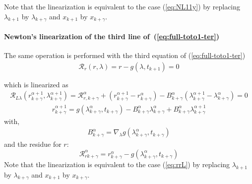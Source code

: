 Note that the linearization is equivalent to the case (\ref{eq:NL11y}) by replacing $\lambda_{k+1}$ by $\lambda_{k+\gamma}$ and $x_{k+1}$ by $x_{k+\gamma}$.

 \paragraph{Newton's linearization of the third  line of~(\ref{eq:full-toto1-ter})}
The same operation is performed with the third equation of (\ref{eq:full-toto1-ter})
\begin{equation}
  \begin{array}{l}
    \mathcal R_r(r,\lambda)=r-g(\lambda,t_{k+1}) =0\\ \\  \end{array}
\end{equation}
which is linearized as
\begin{equation}
  \label{eq:full-NL9}
  \begin{array}{l}
      \mathcal R_{L\lambda}(r^{\alpha+1}_{k+\gamma},\lambda^{\alpha+1}_{k+\gamma}) = \mathcal
      R_{r,k+\gamma}^{\alpha} + (r^{\alpha+1}_{k+\gamma} - r^{\alpha}_{k+\gamma}) - B^{\alpha}_{k+\gamma}(\lambda^{\alpha+1}_{k+\gamma} -
      \lambda^{\alpha}_{k+\gamma})=0
    \end{array}
  \end{equation}
\begin{equation}
  \label{eq:full-rrL}
  \begin{array}{l}
    \boxed{r^{\alpha+1}_{k+\gamma} = g(\lambda ^{\alpha}_{k+\gamma},t_{k+\gamma}) -B^{\alpha}_{k+\gamma}
      \lambda^{\alpha}_{k+\gamma} + B^{\alpha}_{k+\gamma} \lambda^{\alpha+1}_{k+\gamma}}       
  \end{array}
\end{equation}
with,
\begin{equation}
     \begin{array}{l}
  B^{\alpha}_{k+\gamma} = \nabla_{\lambda}g(\lambda ^{\alpha}_{k+\gamma},t_{k+\gamma})
 \end{array}
\end{equation}
and the  residue for $r$:
\begin{equation}
\boxed{\mathcal
      R_{rk+\gamma}^{\alpha} = r^{\alpha}_{k+\gamma} - g(\lambda ^{\alpha}_{k+\gamma},t_{k+\gamma})}
  \end{equation}
Note that the linearization is equivalent to the case (\ref{eq:rrL}) by replacing $\lambda_{k+1}$ by $\lambda_{k+\gamma}$ and $x_{k+1}$ by $x_{k+\gamma}$.

